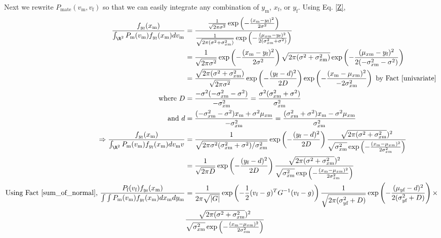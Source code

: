 \documentclass{article}
\newcommand{\x}[1]{\text{#1}}
\begin{document}
\begin{pf}
Next we rewrite $P_\text{mate}(v_\x{m},v_\x{f})$ so that we can easily integrate any combination of $y_\x{m}$, $x_\x{f}$, or $y_\x{f}$. Using Eq. \ref{Z}, 
\begin{align}
\frac{f_{y_\x{f}}(x_\x{m})}{\int_{\R^2}P_\x{m}(v_\x{m})f_{y_\x{f}}(x_\x{m})dv_\x{m}}&=\frac{\frac{1}{\sqrt{2\pi\sigma^2}}\exp\left(-\frac{(x_\x{m}-y_\x{f})^2}{2\sigma^2}\right)}{\frac{1}{\sqrt{2\pi(\sigma^2+\sigma_{x\x{m}}^2)}}\exp\left(-\frac{(\mu_{x\x{m}}-y_\x{f})^2}{2(\sigma_{x\x{m}}^2+\sigma^2)}\right)} \notag
\\&=\frac{1}{\sqrt{2\pi\sigma^2}}\exp\left(-\frac{(x_\x{m}-y_\x{f})^2}{2\sigma^2}\right)\sqrt{2\pi(\sigma^2+\sigma_{x\x{m}}^2)}\exp\left(-\frac{(\mu_{x\x{m}}-y_\x{f})^2}{2(-\sigma_{x\x{m}}^2-\sigma^2)}\right)
\notag\\&=\frac{\sqrt{2\pi(\sigma^2+\sigma_{x\x{m}}^2})}{\sqrt{2\pi\sigma^2}}\exp\left(-\frac{(y_\x{f}-d)^2}{2D}\right)\exp\left(-\frac{(x_\x{m}-\mu_{x\x{m}})^2}{-2\sigma_{x\x{m}}^2}\right)\text{ by Fact \ref{univariate}}
\notag\\ \text{ where } D&=\frac{-\sigma^2(-\sigma_{x\x{m}}^2-\sigma^2)}{-\sigma_{x\x{m}}^2}=\frac{\sigma^2(\sigma_{x\x{m}}^2+\sigma^2)}{\sigma_{x\x{m}}^2}  \label{D}
\\\text{ and } d&=\frac{(-\sigma_{x\x{m}}^2-\sigma^2)x_\x{m}+\sigma^2\mu_{x\x{m}}}{-\sigma_{x\x{m}}^2}=\frac{(\sigma_{x\x{m}}^2+\sigma^2)x_\x{m}-\sigma^2\mu_{x\x{m}}}{\sigma_{x\x{m}}^2}
\notag\\ \Rightarrow \frac{f_{y_\x{f}}(x_\x{m})}{\int_{\R^2}P_\x{m}(v_\x{m})f_{y_\x{f}}(x_\x{m})dv_\x{m}v}&=\frac{1}{\sqrt{2\pi \sigma^2(\sigma_{x\x{m}}^2+\sigma^2)/\sigma_{x\x{m}}^2}}\exp\left(-\frac{(y_\x{f}-d)^2}{2D}\right)\frac{\sqrt{2\pi(\sigma^2+\sigma_{x\x{m}}^2})^2}{\sqrt{\sigma_{x\x{m}}^2}\exp\left(-\frac{(x_\x{m}-\mu_{x\x{m}})^2}{2\sigma_{x\x{m}}^2}\right)}
\notag\\&=\frac{1}{\sqrt{2\pi D}}\exp\left(-\frac{(y_\x{f}-d)^2}{2D}\right)\frac{\sqrt{2\pi(\sigma^2+\sigma_{x\x{m}}^2})^2}{\sqrt{\sigma_{x\x{m}}^2}\exp\left(-\frac{(x_\x{m}-\mu_{x\x{m}})^2}{2\sigma_{x\x{m}}^2}\right)}
\notag\\\text{Using Fact \ref{sum_of_normal}, } \frac{P_\x{f}(v_\x{f})f_{y_\x{f}}(x_\x{m})}{\int\int P_\x{m}(v_\x{m})f_{y_\x{f}}(x_\x{m})dx_\x{m}dy_\x{m}}&=\frac{1}{2\pi\sqrt{|G|}}\exp\left(-\frac{1}{2}(v_\x{f}-g)^TG^{-1}(v_\x{f}-g)\right)\frac{1}{\sqrt{2\pi(\sigma_{y\x{f}}^2+D)}}\exp\left(-\frac{(\mu_{y\x{f}}-d)^2}{2(\sigma_{y\x{f}}^2+D)}\right)\times
\notag\\&\frac{\sqrt{2\pi(\sigma^2+\sigma_{x\x{m}}^2})^2}{\sqrt{\sigma_{x\x{m}}^2}\exp\left(-\frac{(x_\x{m}-\mu_{x\x{m}})^2}{2\sigma_{x\x{m}}^2}\right)} 

\end{align}
\end{pf}
\end{document}
